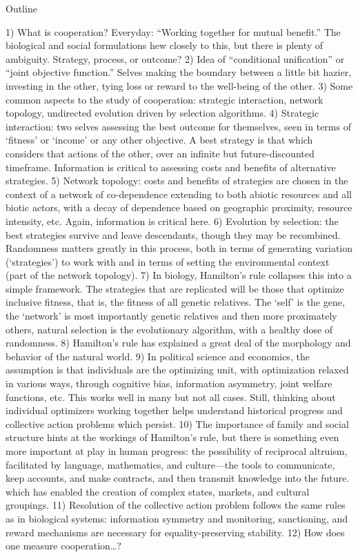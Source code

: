 \documentclass{tufte-book} %
\begin{document}
Outline

1)	What is cooperation? Everyday: “Working together for mutual benefit.” The biological and social formulations hew closely to this, but there is plenty of ambiguity. Strategy, process, or outcome? 
	2)	Idea of “conditional unification” or “joint objective function.” Selves making the boundary between a little bit hazier, investing in the other, tying loss or reward to the well-being of the other. 
	3)	Some common aspects to the study of cooperation: strategic interaction, network topology, undirected evolution driven by selection algorithms. 
	4)	Strategic interaction: two selves assessing the best outcome for themselves, seen in terms of ‘fitness’ or ‘income’ or any other objective. A best strategy is that which considers that actions of the other, over an infinite but future-discounted timeframe. Information is critical to assessing costs and benefits of alternative strategies.
	5)	Network topology: costs and benefits of strategies are chosen in the context of a network of co-dependence extending to both abiotic resources and all biotic actors, with a decay of dependence based on geographic proximity, resource intensity, etc. Again, information is critical here. 
	6)	Evolution by selection: the best strategies survive and leave descendants, though they may be recombined. Randomness matters greatly in this process, both in terms of generating variation (‘strategies’) to work with and in terms of setting the environmental context (part of the network topology). 
	7)	In biology, Hamilton’s rule collapses this into a simple framework. The strategies that are replicated will be those that optimize inclusive fitness, that is, the fitness of all genetic relatives. The ‘self’ is the gene, the ‘network’ is most importantly genetic relatives and then more proximately others, natural selection is the evolutionary algorithm, with a healthy dose of randomness. 
	8)	Hamilton’s rule has explained a great deal of the morphology and behavior of the natural world. 
	9)	In political science and economics, the assumption is that individuals are the optimizing unit, with optimization relaxed in various ways, through cognitive bias, information asymmetry, joint welfare functions, etc. This works well in many but not all cases. Still, thinking about individual optimizers working together helps understand historical progress and collective action problems which persist. 
	10)	The importance of family and social structure hints at the workings of Hamilton’s rule, but there is something even more important at play in human progress: the possibility of reciprocal altruism, facilitated by language, mathematics, and culture—the tools to communicate, keep accounts, and make contracts, and then transmit knowledge into the future. which has enabled the creation of complex states, markets, and cultural groupings. 
	11)	Resolution of the collective action problem follows the same rules as in biological systems: information symmetry and monitoring, sanctioning, and reward mechanisms are necessary for equality-preserving stability.
	12)	How does one measure cooperation…?
\end{document}
